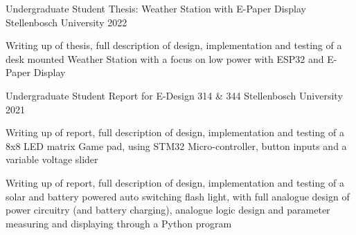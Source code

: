 

\begin{cventries}

  \cventry
    {Undergraduate Student} %
    {Thesis: Weather Station with E-Paper Display} %
    {Stellenbosch University} %
    {2022} %
    {
      \begin{cvitems} %
        \item {Writing up of thesis, full description of design, implementation and testing of a desk mounted Weather Station with a focus on low power with ESP32 and E-Paper Display}
      \end{cvitems}
    }

  \cventry
    {Undergraduate Student} %
    {Report for E-Design 314 \& 344} %
    {Stellenbosch University} %
    {2021} %
    {
      \begin{cvitems} %
        \item {Writing up of report, full description of design, implementation and testing of a 8x8 LED matrix Game pad, using STM32 Micro-controller, button inputs and a variable voltage slider}
        \item {Writing up of report, full description of design, implementation and testing of a solar and battery powered auto switching flash light, with full analogue design of power circuitry (and battery charging), analogue logic design and parameter measuring and displaying through a Python program}
      \end{cvitems}
    }

\end{cventries}
